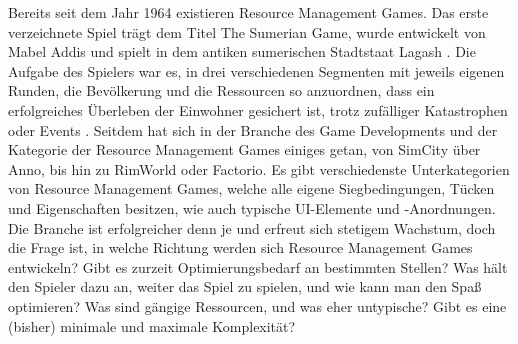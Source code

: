 
Bereits seit dem Jahr 1964 existieren Resource Management Games. Das erste verzeichnete Spiel trägt dem Titel \glqq The Sumerian Game\grqq, wurde entwickelt von Mabel Addis und spielt in dem antiken sumerischen Stadtstaat Lagash \cite{rmgwiki}. Die Aufgabe des Spielers war es, in drei verschiedenen Segmenten mit jeweils eigenen Runden, die Bevölkerung und die Ressourcen so anzuordnen, dass ein erfolgreiches Überleben der Einwohner gesichert ist, trotz zufälliger Katastrophen oder Events \cite{tsgwiki}. Seitdem hat sich in der Branche des Game Developments und der Kategorie der Resource Management Games einiges getan, von SimCity über Anno, bis hin zu RimWorld oder Factorio. Es gibt verschiedenste Unterkategorien von Resource Management Games, welche alle eigene Siegbedingungen, Tücken und Eigenschaften besitzen, wie auch typische UI-Elemente und -Anordnungen. Die Branche ist erfolgreicher denn je und erfreut sich stetigem Wachstum, doch die Frage ist, in welche Richtung werden sich Resource Management Games entwickeln? Gibt es zurzeit Optimierungsbedarf an bestimmten Stellen? Was hält den Spieler dazu an, weiter das Spiel zu spielen, und wie kann man den Spaß optimieren? Was sind gängige Ressourcen, und was eher untypische? Gibt es eine (bisher) minimale und maximale Komplexität?